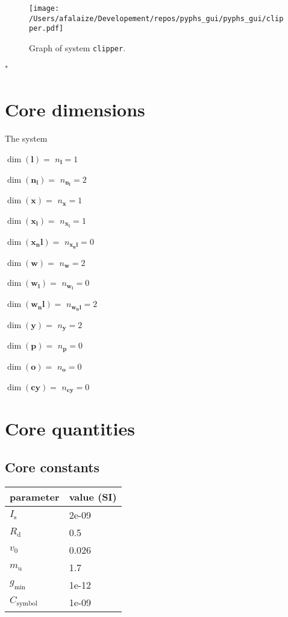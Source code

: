 \documentclass[11pt, oneside]{article}      %
\begin{document}
%
%
\begin{figure}[!h]
\begin{center}
\texttt{[image: /Users/afalaize/Developement/repos/pyphs\_gui/pyphs\_gui/clipper.pdf]}
%
\caption{\label{fig:graphclipper} Graph of system \texttt{clipper}. }
\end{center}
\end{figure}
%
%
%
"\section{Core dimensions}

The system

$\dim(\mathbf{l})=$ $ n_\mathbf{l} = 1$ \par $\dim(\mathbf{n_l})=$ $ n_\mathbf{n_l} = 2$ \par $\dim(\mathbf{x})=$ $ n_\mathbf{x} = 1$ \par $\dim(\mathbf{x_l})=$ $ n_\mathbf{x_l} = 1$ \par $\dim(\mathbf{x_nl})=$ $ n_\mathbf{x_nl} = 0$ \par $\dim(\mathbf{w})=$ $ n_\mathbf{w} = 2$ \par $\dim(\mathbf{w_l})=$ $ n_\mathbf{w_l} = 0$ \par $\dim(\mathbf{w_nl})=$ $ n_\mathbf{w_nl} = 2$ \par $\dim(\mathbf{y})=$ $ n_\mathbf{y} = 2$ \par $\dim(\mathbf{p})=$ $ n_\mathbf{p} = 0$ \par $\dim(\mathbf{o})=$ $ n_\mathbf{o} = 0$ \par $\dim(\mathbf{cy})=$ $ n_\mathbf{cy} = 0$ \par 
%
%
\section{Core quantities}
%
%
\subsection{Core constants}
%
\begin{center}
%
\begin{tabular}{ll}
%
\hline
parameter & value (SI)
\\ \hline
$I_{\mathrm{s}}$ & 2e-09
\\
$R_{\mathrm{d}}$ & 0.5
\\
$v_{\mathrm{0}}$ & 0.026
\\
$m_{\mathrm{u}}$ & 1.7
\\
$g_{\mathrm{min}}$ & 1e-12
\\
$C_{\mathrm{symbol}}$ & 1e-09
\\
\hline
\end{tabular}
%
\end{center}
%
\end{document}
